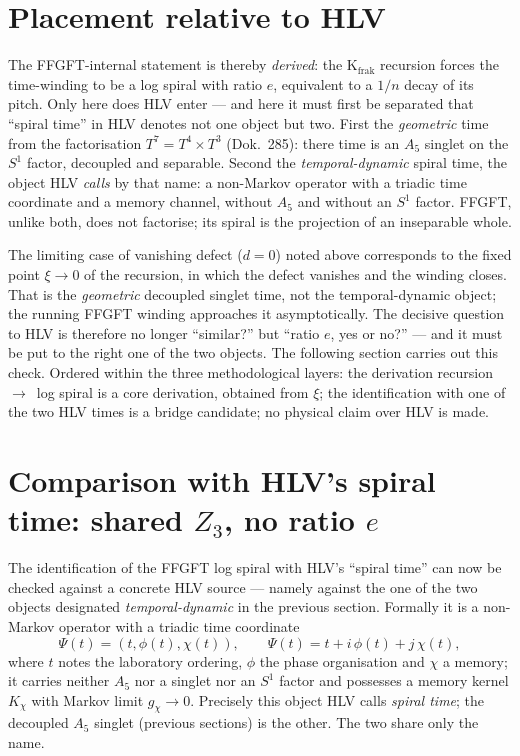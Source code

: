 \section{Placement relative to HLV}
The FFGFT-internal statement is thereby \emph{derived}: the K$_{\text{frak}}$ recursion forces the
time-winding to be a log spiral with ratio $e$, equivalent to a $1/n$ decay of its pitch. Only here
does HLV enter --- and here it must first be separated that \enquote{spiral time} in HLV denotes
not one object but two. First the \emph{geometric} time from the factorisation $T^7=T^4\times T^3$
(Dok.~285): there time is an $A_5$ singlet on the $S^1$ factor, decoupled and separable. Second the
\emph{temporal-dynamic} spiral time, the object HLV \emph{calls} by that name: a non-Markov
operator with a triadic time coordinate and a memory channel, without $A_5$ and without an $S^1$
factor. FFGFT, unlike both, does not factorise; its spiral is the projection of an inseparable
whole.

The limiting case of vanishing defect ($d=0$) noted above corresponds to the
fixed point $\xi\to0$ of
the recursion, in which the defect vanishes and the winding closes. That is the \emph{geometric}
decoupled singlet time, not the temporal-dynamic object; the running FFGFT winding approaches it
asymptotically. The decisive question to HLV is therefore no longer \enquote{similar?} but
\enquote{ratio $e$, yes or no?} --- and it must be put to the right one of the two objects. The
following section carries out this check. Ordered within the three methodological layers: the
derivation recursion~$\to$~log spiral is a core derivation, obtained from $\xi$; the identification
with one of the two HLV times is a bridge candidate; no physical claim over HLV is made.

\section{Comparison with HLV's spiral time: shared $Z_3$, no ratio $e$}
The identification of the FFGFT log spiral with HLV's \enquote{spiral time} can now be checked
against a concrete HLV source --- namely against the one of the two objects designated
\emph{temporal-dynamic} in the previous section. Formally it is a non-Markov operator with a triadic
time coordinate
\begin{equation}
  \Psi(t)=(t,\phi(t),\chi(t)),\qquad \Psi(t)=t+i\,\phi(t)+j\,\chi(t),
\end{equation}
where $t$ notes the laboratory ordering, $\phi$ the phase organisation and $\chi$ a memory; it
carries neither $A_5$ nor a singlet nor an $S^1$ factor and possesses a memory kernel $K_\chi$ with
Markov limit $g_\chi\to0$. Precisely this object HLV calls \emph{spiral time}; the decoupled $A_5$
singlet (previous sections) is the other. The two share only the name.

